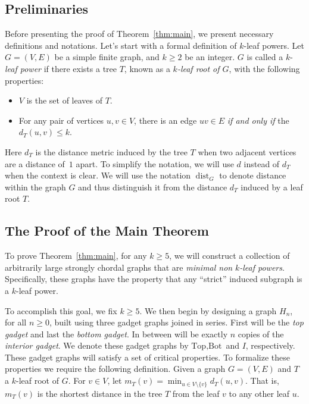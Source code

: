 \documentclass[11pt,letter]{article}
\theoremstyle{remark}
\newcommand{\T}{\text{Top}}
\newcommand{\B}{\text{Bot}}
\DeclareMathOperator{\dist}{dist}
\begin{document}
\subsection{Preliminaries}
Before presenting the proof of Theorem~\ref{thm:main}, we present  
necessary definitions and notations.
Let's start with a formal definition of $k$-leaf powers. Let $G = (V,E)$ be a simple finite graph, and $k\geq 2$ be an integer. $G$ is called a $k$-\emph{leaf power} if there exists a tree $T$, known as a {\em $k$-leaf root of $G$}, with the following properties:
\begin{itemize}
    \item $V$ is the set of leaves of $T$.
    \item For any pair of vertices $u,v \in V$, there is an edge $uv \in E$ {\em if and only if} the $d_T(u,v) \leq k$.
\end{itemize}
Here $d_T$ is the distance metric induced by the tree $T$ when two adjacent vertices are a distance of~$1$ apart.
To simplify the notation, we will use $d$ instead of $d_T$ when the context is clear. We will use the notation $\dist_G$ to denote distance within the graph $G$ and thus distinguish it from the distance $d_T$ induced by a leaf root $T$.


 


\subsection{The Proof of the Main Theorem}

To prove Theorem~\ref{thm:main}, for any $k\ge 5$, we will construct a collection of arbitrarily large strongly chordal graphs that are \emph{minimal non }$k$\emph{-leaf powers}. Specifically, these graphs have the property that any ``strict'' induced subgraph is a $k$-leaf power.

To accomplish this goal, we fix $k\ge 5$. We then begin by designing a graph $H_n$, for all $n\geq 0$,
built using three gadget graphs joined in series. First will be the {\em top gadget} and last the {\em bottom gadget}. In between will be exactly $n$ copies of the 
{\em interior gadget}.
We denote these gadget graphs by $\T, \B$ and $I$,
respectively. These gadget graphs will satisfy a set
of critical properties. To formalize these properties we require the following definition.
Given a graph $G=(V,E)$ and $T$ a $k$-leaf root of $G$. For $v\in V$, let $m_T(v)=\min_{u\in V\setminus \{v\}} d_T(u,v)$. That is, $m_T(v)$ is the shortest distance in the tree $T$ from the leaf $v$ to any other leaf $u$. 
\end{document}
